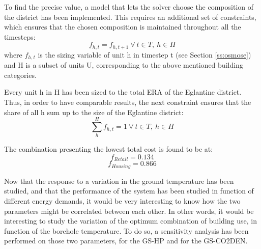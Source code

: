 \documentclass{article}
\begin{document}
To find the precise value, a model that lets the solver choose the composition of the district has been implemented. This requires an additional set of constraints, which ensures that the chosen composition is maintained throughout all the timesteps:
\begin{equation}
f_{h,t} = f_{h,t+1} \ \forall \ t \in T, \ h \in H
\end{equation}
where $f_{h,t}$ is the sizing variable of unit h in timestep t (see Section \ref{ss:osmose}) and H is a subset of units U, corresponding to the above mentioned building categories.

Every unit h in H has been sized to the total ERA of the Eglantine district. Thus, in order to have comparable results, the next constraint ensures that the share of all h sum up to the size of the Eglantine district:
\begin{equation}
\sum_{h}^{H} f_{h,t} = 1 \ \forall \ t \in T, \ h \in H
\end{equation}

The combination presenting the lowest total cost is found to be at:
$$f_{Retail} = 0.134$$
$$f_{Housing} = 0.866$$

Now that the response to a variation in the ground temperature has been studied, and that the performance of the system has been studied in function of different energy demands, it would be very interesting to know how the two parameters might be correlated between each other. In other words, it would be interesting to study the variation of the optimum combination of building use, in function of the borehole temperature. 
To do so, a sensitivity analysis has been performed on those two parameters, for the GS-HP and for the GS-CO2DEN. 
\end{document}
